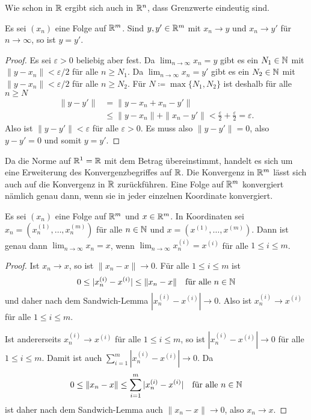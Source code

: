 \documentclass[a4paper,10pt]{article}
\begin{document}
Wie schon in $\mathbb{R}$ ergibt sich auch in $\mathbb{R}^n$, dass Grenzwerte eindeutig sind.


\begin{lem}
 Es sei $(x_n)$ eine Folge auf $\mathbb{R}^m$. Sind $y, y' \in \mathbb{R}^m$ mit $x_n \to y$ und $x_n \to y'$ für $n \to \infty$, so ist $y = y'$.
\end{lem}
\begin{proof}
 Es sei $\varepsilon > 0$ beliebig aber fest. Da $\lim_{n \to \infty} x_n = y$ gibt es ein $N_1 \in \mathbb{N}$ mit $\|y - x_n\| < \varepsilon/2$  für alle $n \geq N_1$. Da $\lim_{n \to \infty} x_n = y'$ gibt es ein $N_2 \in \mathbb{N}$ mit $\|y - x_n\| < \varepsilon/2$  für alle $n \geq N_2$. Für $N \coloneqq \max\{N_1, N_2\}$ ist deshalb für alle $n \geq N$
 \begin{align*}
  \|y-y'\|
  &= \|y-x_n + x_n-y'\| \\
  &\leq \|y-x_n\| + \|x_n-y'\|
  < \frac{\varepsilon}{2} + \frac{\varepsilon}{2}
  = \varepsilon.
 \end{align*}
 Also ist $\|y-y'\| < \varepsilon$ für alle $\varepsilon > 0$. Es muss also $\|y-y'\| = 0$, also $y-y' = 0$ und somit $y = y'$.
\end{proof}


Da die Norme auf $\mathbb{R}^1 = \mathbb{R}$ mit dem Betrag übereinstimmt, handelt es sich um eine Erweiterung des Konvergenzbegriffes auf $\mathbb{R}$. Die Konvergenz in $\mathbb{R}^m$ lässt sich auch auf die Konvergenz in $\mathbb{R}$ zurückführen. Eine Folge auf $\mathbb{R}^m$ konvergiert nämlich genau dann, wenn sie in jeder einzelnen Koordinate konvergiert.


\begin{lem}\label{lem: convergence in coordinates}
 Es sei $(x_n)$ eine Folge auf $\mathbb{R}^m$ und $x \in \mathbb{R}^m$. In Koordinaten sei $x_n = (x^{(1)}_n, \dotsc, x^{(m)}_n)$ für alle $n \in \mathbb{N}$ und $x = (x^{(1)}, \dotsc, x^{(m)})$. Dann ist genau dann $\lim_{n \to \infty} x_n = x$, wenn $\lim_{n \to \infty} x^{(i)}_n = x^{(i)}$ für alle $1 \leq i \leq m$.
\end{lem}
\begin{proof}
 Ist $x_n \to x$, so ist $\|x_n - x\| \to 0$. Für alle $1 \leq i \leq m$ ist
 \[
  0 \leq |x^{(i)}_n - x^{(i)}| \leq \|x_n - x\| \quad \text{für alle $n \in \mathbb{N}$}
 \]
 und daher nach dem Sandwich-Lemma $|x^{(i)}_n - x^{(i)}| \to 0$. Also ist $x^{(i)}_n \to x^{(i)}$ für alle $1 \leq i \leq m$.
 
 Ist andererseits $x^{(i)}_n \to x^{(i)}$ für alle $1 \leq i \leq m$, so ist $|x^{(i)}_n - x^{(i)}| \to 0$ für alle $1 \leq i \leq m$. Damit ist auch $\sum_{i=1}^m |x^{(i)}_n - x^{(i)}| \to 0$. Da
 \[
  0 \leq \|x_n - x\| \leq \sum_{i=1}^m |x^{(i)}_n - x^{(i)}| \quad \text{für alle $n \in \mathbb{N}$}
 \]
 ist daher nach dem Sandwich-Lemma auch $\|x_n - x\| \to 0$, also $x_n \to x$.
\end{proof}
\end{document}

